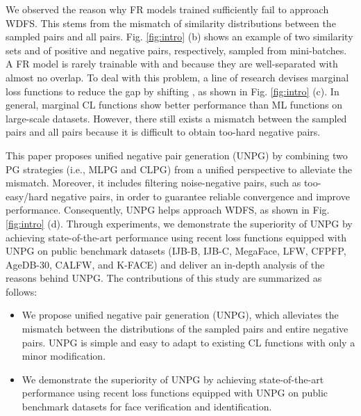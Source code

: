 \documentclass[10pt,twocolumn]{article}
\begin{document}
We observed the reason why FR models trained sufficiently fail to approach WDFS. This stems from the mismatch of similarity distributions between the sampled pairs and all pairs. Fig. \ref{fig:intro} (b) shows an example of two similarity sets  and  of positive and negative pairs, respectively, sampled from mini-batches. A FR model is rarely trainable with  and  because they are well-separated with almost no overlap. To deal with this problem, a line of research\cite{sun2020circle, wang2019multi, yu2019deep, liu2017sphereface, deng2019arcface, wang2018cosface, meng2021magface} devises marginal loss functions to reduce the gap by shifting , as shown in Fig. \ref{fig:intro} (c). In general, marginal CL functions show better performance than ML functions on large-scale datasets\cite{guo2016ms}. However, there still exists a mismatch between the sampled pairs and all pairs because it is difficult to obtain too-hard negative pairs.

This paper proposes unified negative pair generation (UNPG) by combining two PG strategies (i.e., MLPG and CLPG) from a unified perspective to alleviate the mismatch. Moreover, it includes filtering noise-negative pairs, such as too-easy/hard negative pairs, in order to guarantee reliable convergence and improve performance. Consequently, UNPG helps approach WDFS, as shown in Fig. \ref{fig:intro} (d). Through experiments, we demonstrate the superiority of UNPG by achieving state-of-the-art performance using recent loss functions equipped with UNPG on public benchmark datasets  (IJB-B\cite{whitelam2017iarpa}, IJB-C\cite{maze2018iarpa}, MegaFace\cite{kemelmacher2016megaface}, LFW\cite{huang2008labeled}, CFPFP\cite{sengupta2016frontal}, AgeDB-30\cite{moschoglou2017agedb}, CALFW\cite{zheng2017cross}, and K-FACE\cite{choi2021k}) and deliver an in-depth analysis of the reasons behind UNPG. The contributions of this study are summarized as follows:
\begin{itemize}
  \item We propose unified negative pair generation (UNPG), which alleviates the mismatch between the distributions of the sampled pairs and entire negative pairs. UNPG is simple and easy to adapt to existing CL functions with only a minor modification.    
  \item We demonstrate the superiority of UNPG by achieving state-of-the-art performance using recent loss functions equipped with UNPG on public benchmark datasets for face verification and identification.
\end{itemize}
\end{document}
